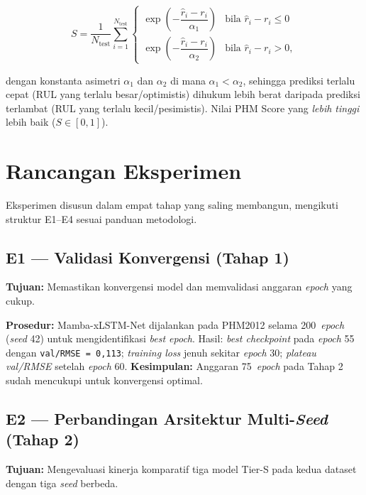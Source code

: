 \begin{equation}\label{eq:bab4_phmscore}
S = \frac{1}{N_{\text{test}}} \sum_{i=1}^{N_{\text{test}}}
  \begin{cases}
  \exp\!\left(-\dfrac{\hat{r}_i - r_i}{\alpha_{1}}\right) & \text{bila } \hat{r}_i - r_i \leq 0 \\[6pt]
  \exp\!\left(-\dfrac{\hat{r}_i - r_i}{\alpha_{2}}\right) & \text{bila } \hat{r}_i - r_i > 0,
  \end{cases}
\end{equation}

\noindent dengan konstanta asimetri $\alpha_{1}$ dan $\alpha_{2}$
di mana $\alpha_{1} < \alpha_{2}$, sehingga prediksi terlalu cepat
(RUL yang terlalu besar/optimistis) dihukum lebih berat daripada
prediksi terlambat (RUL yang terlalu kecil/pesimistis).
Nilai PHM Score yang \emph{lebih tinggi} lebih baik ($S \in [0, 1]$).

\section{Rancangan Eksperimen}
\label{sec:bab4_eksperimen}

Eksperimen disusun dalam empat tahap yang saling membangun, mengikuti
struktur E1--E4 sesuai panduan metodologi.

\subsection{E1 — Validasi Konvergensi (Tahap 1)}
\label{subsec:bab4_e1}

\textbf{Tujuan:} Memastikan konvergensi model dan memvalidasi anggaran
\emph{epoch} yang cukup.

\textbf{Prosedur:} Mamba-xLSTM-Net dijalankan pada PHM2012 selama
200~\emph{epoch} (\emph{seed} 42) untuk mengidentifikasi \emph{best
epoch}.
Hasil: \emph{best checkpoint} pada \emph{epoch} 55 dengan
\texttt{val/RMSE = 0{,}113}; \emph{training loss} jenuh sekitar
\emph{epoch} 30; \emph{plateau val/RMSE} setelah \emph{epoch} 60.
\textbf{Kesimpulan:} Anggaran 75~\emph{epoch} pada Tahap 2 sudah
mencukupi untuk konvergensi optimal.

\subsection{E2 — Perbandingan Arsitektur Multi-\emph{Seed} (Tahap 2)}
\label{subsec:bab4_e2}

\textbf{Tujuan:} Mengevaluasi kinerja komparatif tiga model Tier-S
pada kedua dataset dengan tiga \emph{seed} berbeda.

